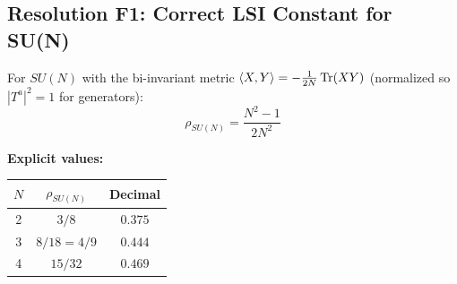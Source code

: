 \subsection{Resolution F1: Correct LSI Constant for SU(N)}
\label{subsec:lsi-constant-correct}

\begin{theorem}
\label{thm:lsi-correct}
For $SU(N)$ with the bi-invariant metric $\langle X, Y \rangle = -\frac{1}{2N}\operatorname{Tr}(XY)$ 
(normalized so $|T^a|^2 = 1$ for generators):
\begin{equation}
\boxed{\rho_{SU(N)} = \frac{N^2-1}{2N^2}}
\end{equation}

\textbf{Explicit values:}
\begin{center}
\begin{tabular}{|c|c|c|}
\hline
$N$ & $\rho_{SU(N)}$ & Decimal \\
\hline
2 & $3/8$ & $0.375$ \\
3 & $8/18 = 4/9$ & $0.444$ \\
4 & $15/32$ & $0.469$ \\
\hline
\end{tabular}
\end{center}
\end{theorem}


